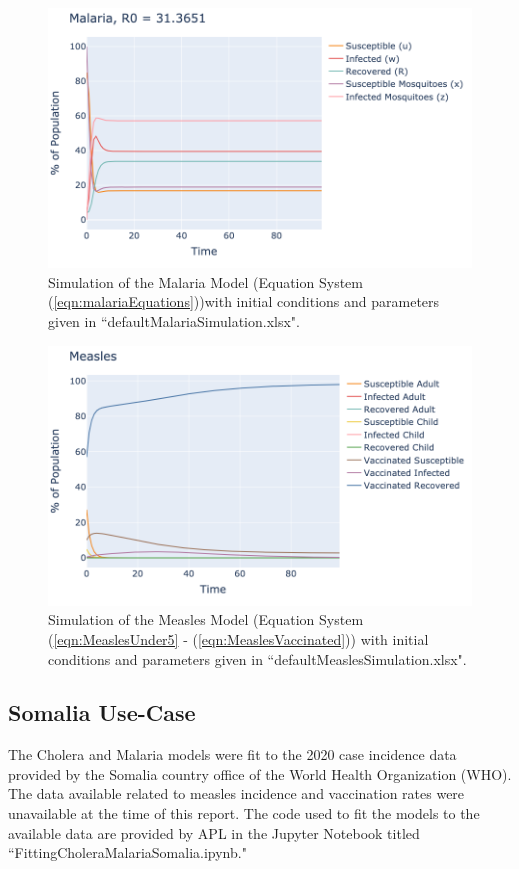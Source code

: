 \documentclass[letter,12pt, usenames,dvipsnames]{article}
\begin{document}
\begin{figure}[h!]
    \centering
    \includegraphics[width = .9\textwidth]{MalariaRun.png}
    \caption{Simulation of the Malaria Model (Equation System (\ref{eqn:malariaEquations}))with initial conditions and parameters given in ``defaultMalariaSimulation.xlsx".}
    \label{fig:my_label}
\end{figure}

\begin{figure}[h!]
    \centering
    \includegraphics[width = .9\textwidth]{MeaslesRun.png}
    \caption{Simulation of the Measles Model (Equation System (\ref{eqn:MeaslesUnder5} - (\ref{eqn:MeaslesVaccinated})) with initial conditions and parameters given in ``defaultMeaslesSimulation.xlsx".}
    \label{fig:my_label}
\end{figure}

\subsection{Somalia Use-Case}
The Cholera and Malaria models were fit to the 2020 case incidence data provided by the Somalia country office of the World Health Organization (WHO).  The data available related to measles incidence and vaccination rates were unavailable at the time of this report.  The code used to fit the models to the available data are provided by APL in the Jupyter Notebook titled ``FittingCholeraMalariaSomalia.ipynb."
\end{document}
